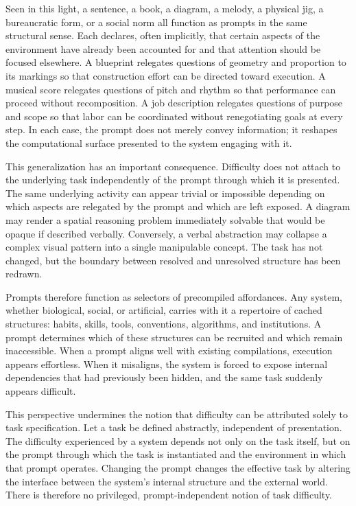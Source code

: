 \documentclass[12pt]{article}
\begin{document}
Seen in this light, a sentence, a book, a diagram, a melody, a physical jig, a bureaucratic form, or a social norm all function as prompts in the same structural sense. Each declares, often implicitly, that certain aspects of the environment have already been accounted for and that attention should be focused elsewhere. A blueprint relegates questions of geometry and proportion to its markings so that construction effort can be directed toward execution. A musical score relegates questions of pitch and rhythm so that performance can proceed without recomposition. A job description relegates questions of purpose and scope so that labor can be coordinated without renegotiating goals at every step. In each case, the prompt does not merely convey information; it reshapes the computational surface presented to the system engaging with it.

This generalization has an important consequence. Difficulty does not attach to the underlying task independently of the prompt through which it is presented. The same underlying activity can appear trivial or impossible depending on which aspects are relegated by the prompt and which are left exposed. A diagram may render a spatial reasoning problem immediately solvable that would be opaque if described verbally. Conversely, a verbal abstraction may collapse a complex visual pattern into a single manipulable concept. The task has not changed, but the boundary between resolved and unresolved structure has been redrawn.

Prompts therefore function as selectors of precompiled affordances. Any system, whether biological, social, or artificial, carries with it a repertoire of cached structures: habits, skills, tools, conventions, algorithms, and institutions. A prompt determines which of these structures can be recruited and which remain inaccessible. When a prompt aligns well with existing compilations, execution appears effortless. When it misaligns, the system is forced to expose internal dependencies that had previously been hidden, and the same task suddenly appears difficult.

This perspective undermines the notion that difficulty can be attributed solely to task specification. Let a task be defined abstractly, independent of presentation. The difficulty experienced by a system depends not only on the task itself, but on the prompt through which the task is instantiated and the environment in which that prompt operates. Changing the prompt changes the effective task by altering the interface between the system’s internal structure and the external world. There is therefore no privileged, prompt-independent notion of task difficulty.
\end{document}
